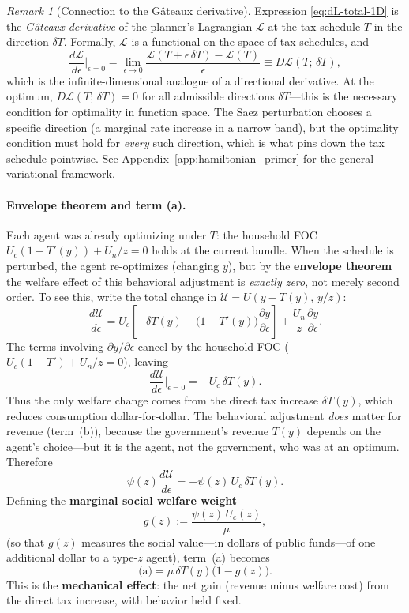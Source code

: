 \documentclass[12pt,a4paper]{article}
\theoremstyle{definition}
\theoremstyle{plain}
\theoremstyle{remark}
\newtheorem{remark}{Remark}[section]
\newcommand{\calU}{\mathcal{U}}
\begin{document}
\begin{remark}[Connection to the Gâteaux derivative]
\label{rem:gateaux}
Expression \eqref{eq:dL-total-1D} is the \emph{Gâteaux derivative} of the planner's Lagrangian $\mathcal{L}$ at the tax schedule $T$ in the direction $\delta T$. Formally, $\mathcal{L}$ is a functional on the space of tax schedules, and
\[
  \frac{d\mathcal{L}}{d\epsilon}\bigg|_{\epsilon=0}
  = \lim_{\epsilon \to 0} \frac{\mathcal{L}(T + \epsilon\,\delta T) - \mathcal{L}(T)}{\epsilon}
  \equiv D\mathcal{L}(T;\, \delta T),
\]
which is the infinite-dimensional analogue of a directional derivative. At the optimum, $D\mathcal{L}(T;\, \delta T) = 0$ for all admissible directions $\delta T$---this is the necessary condition for optimality in function space. The Saez perturbation chooses a specific direction (a marginal rate increase in a narrow band), but the optimality condition must hold for \emph{every} such direction, which is what pins down the tax schedule pointwise. See Appendix~\ref{app:hamiltonian_primer} for the general variational framework.
\end{remark}

\paragraph{Envelope theorem and term (a).}
Each agent was already optimizing under $T$: the household FOC
$U_c(1-T'(y)) + U_n/z = 0$ holds at the current bundle. When the
schedule is perturbed, the agent re-optimizes (changing $y$),
but by the \textbf{envelope theorem} the welfare effect of
this behavioral adjustment is \emph{exactly zero}, not merely
second order. To see this, write the total change in
$\calU = U(y-T(y),\,y/z)$:
\[
\frac{d\calU}{d\epsilon}
= U_c\!\left[-\delta T(y)
  + \bigl(1-T'(y)\bigr)\frac{\partial y}{\partial\epsilon}
  \right]
+ \frac{U_n}{z}\frac{\partial y}{\partial\epsilon}.
\]
The terms involving $\partial y/\partial\epsilon$ cancel by the
household FOC ($U_c(1-T') + U_n/z = 0$), leaving
\[
\frac{d\calU}{d\epsilon}\bigg|_{\epsilon=0}
= -U_c\,\delta T(y).
\]
Thus the only welfare change comes from the direct tax increase
$\delta T(y)$, which reduces consumption dollar-for-dollar.
The behavioral adjustment \emph{does} matter for revenue
(term~(b)), because the government's revenue $T(y)$ depends on
the agent's choice---but it is the agent, not the government,
who was at an optimum. Therefore
\[
\psi(z)\frac{d\calU}{d\epsilon}
= -\psi(z)\,U_c\,\delta T(y).
\]
Defining the \textbf{marginal social welfare weight}
\begin{equation}
\label{eq:g-pert}
  g(z) := \frac{\psi(z)\,U_c(z)}{\mu},
\end{equation}
(so that $g(z)$ measures the social value---in dollars of
public funds---of one additional dollar to a type-$z$ agent),
term~(a) becomes
\begin{equation}
\label{eq:term-a-1D}
\text{(a)}
= \mu\,\delta T(y)\bigl(1 - g(z)\bigr).
\end{equation}
This is the \textbf{mechanical effect}: the net gain (revenue
minus welfare cost) from the direct tax increase, with behavior
held fixed.
\end{document}
